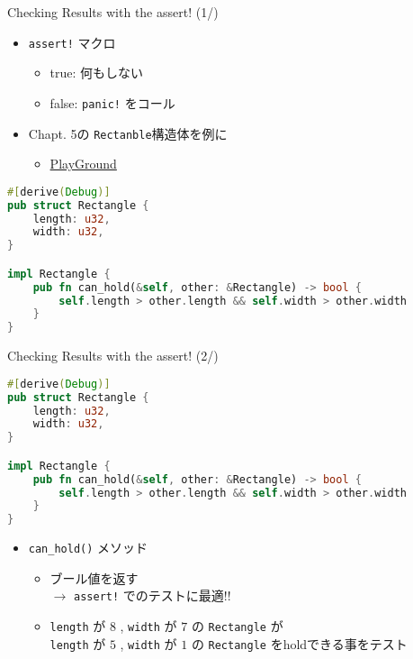 \documentclass[cjk,14pt,xcolor=dvipsnames,table,dvipdfmx,professional font,t,fragile]{beamer}
\begin{document}
\begin{frame}[containsverbatim]{Checking Results with the assert! (1/)}
 \begin{itemize}
  \item \verb|assert!| マクロ
	\begin{itemize}
	 \item true: 何もしない
	 \item false: \verb|panic!| をコール
	\end{itemize}
  \item Chapt. 5の \texttt{Rectanble}構造体を例に
	\begin{itemize}
	 \item 	\href{https://play.integer32.com/?version=stable&mode=debug&edition=2018&gist=dc15fce8e988e1efd0a2dd8d8d87dd27}
		{PlayGround}
	\end{itemize}
 \end{itemize}
 {\scriptsize
 \begin{lstlisting}[language=Rust,style=boxed,style=colouredRust]
#[derive(Debug)]
pub struct Rectangle {
    length: u32,
    width: u32,
}

impl Rectangle {
    pub fn can_hold(&self, other: &Rectangle) -> bool {
        self.length > other.length && self.width > other.width
    }
}\end{lstlisting}}

\end{frame}

\begin{frame}[containsverbatim]{Checking Results with the assert! (2/)}
\mbox{}
 {\scriptsize
 \begin{lstlisting}[language=Rust,style=boxed,style=colouredRust]
#[derive(Debug)]
pub struct Rectangle {
    length: u32,
    width: u32,
}

impl Rectangle {
    pub fn can_hold(&self, other: &Rectangle) -> bool {
        self.length > other.length && self.width > other.width
    }
}\end{lstlisting}}
 \begin{itemize}
   \item \verb|can_hold()| メソッド
	 \begin{itemize}
	  \item ブール値を返す\\
		\hspace{3zw} $\rightarrow$ \verb|assert!| でのテストに最適!!
	  \item \verb|length| が $8$ , \verb|width| が $7$ の \verb|Rectangle| が\\
		\verb|length| が $5$ , \verb|width| が $1$ の \verb|Rectangle|
		をholdできる事をテスト
	 \end{itemize}
 \end{itemize}
\end{frame}
\end{document}
